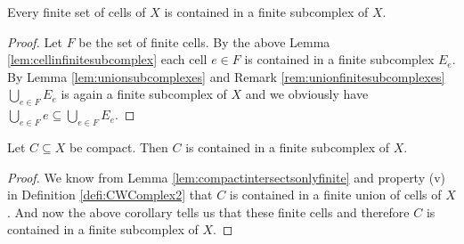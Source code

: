 \begin{cor}
    Every finite set of cells of $X$ is contained in a finite subcomplex of $X$.
\end{cor}
\begin{proof}
    Let $F$ be the set of finite cells. 
    By the above Lemma \ref{lem:cellinfinitesubcomplex} each cell $e \in F$ is contained in a finite subcomplex $E_e$. 
    By Lemma \ref{lem:unionsubcomplexes} and Remark \ref{rem:unionfinitesubcomplexes} $\bigcup_{e \in F}E_e$ is again a finite subcomplex of $X$ and we obviously have $\bigcup_{e \in F} e \subseteq \bigcup_{e \in F}E_e$.
\end{proof}

\begin{cor} \label{cor:compactinfinitesubcomplex}
    Let $C \subseteq X$ be compact. 
    Then $C$ is contained in a finite subcomplex of $X$.
\end{cor}
\begin{proof}
    We know from Lemma \ref{lem:compactintersectsonlyfinite} and property (v) in Definition \ref{defi:CWComplex2} that $C$ is contained in a finite union of cells of $X$. 
    And now the above corollary tells us that these finite cells and therefore $C$ is contained in a finite subcomplex of $X$.
\end{proof}
